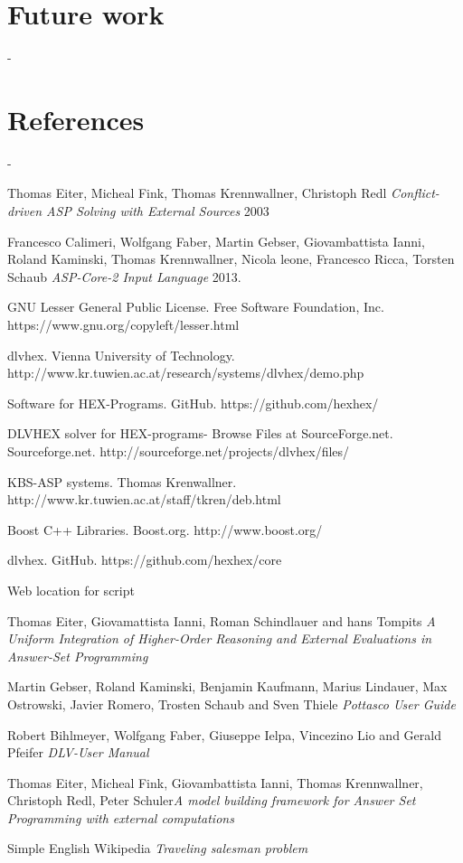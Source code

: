 \documentclass[14pt,a4paper, titlepage]{article}
\begin{document}
\section{Future work}
\label{sec:future}


 \newpage
-\section{References}
-\begin{thebibliography}{1}
 Thomas Eiter, Micheal Fink, Thomas Krennwallner, Christoph Redl {\em Conflict-driven ASP Solving with External Sources} 2003   
  
 Francesco Calimeri, Wolfgang Faber, Martin Gebser, Giovambattista Ianni, Roland Kaminski, Thomas Krennwallner, Nicola leone, Francesco Ricca, Torsten Schaub {\em ASP-Core-2 Input Language} 2013.

 GNU Lesser General Public License. Free Software Foundation, Inc. https://www.gnu.org/copyleft/lesser.html 

dlvhex. Vienna University of Technology. http://www.kr.tuwien.ac.at/research/systems/dlvhex/demo.php 

Software for HEX-Programs. GitHub. https://github.com/hexhex/ 

DLVHEX solver for HEX-programs-  Browse Files at SourceForge.net. Sourceforge.net. http://sourceforge.net/projects/dlvhex/files/

KBS-ASP systems. Thomas Krenwallner. http://www.kr.tuwien.ac.at/staff/tkren/deb.html

Boost C++ Libraries. Boost.org. http://www.boost.org/

% 
%
 
dlvhex. GitHub. https://github.com/hexhex/core

Web location for script

Thomas Eiter, Giovamattista Ianni, Roman Schindlauer and hans Tompits {\em A Uniform Integration of Higher-Order Reasoning and External Evaluations in Answer-Set Programming} 


Martin Gebser, Roland Kaminski, Benjamin Kaufmann, Marius Lindauer, Max Ostrowski, Javier Romero, Trosten Schaub and Sven Thiele {\em Pottasco User Guide}

Robert Bihlmeyer, Wolfgang Faber, Giuseppe Ielpa, Vincezino Lio and Gerald Pfeifer {\em DLV-User Manual} 

Thomas Eiter, Micheal Fink, Giovambattista Ianni, Thomas Krennwallner, Christoph Redl, Peter Schuler{\em A model building framework for Answer Set Programming with external computations} 

 Simple English Wikipedia {\em Traveling salesman problem}
 
 
\end{thebibliography} 
\end{document}
